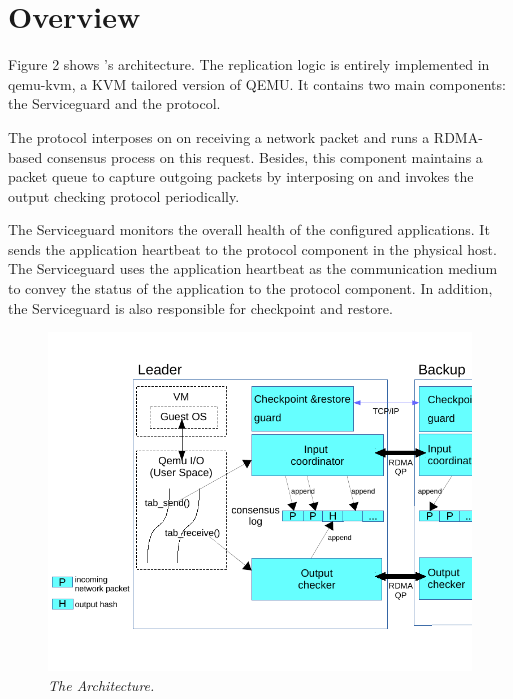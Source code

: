 \section{\xxx Overview} \label{sec:overview}

Figure 2 shows \xxx's architecture. The replication logic is entirely 
implemented in qemu-kvm, a KVM tailored version of QEMU. It contains 
two main components: the Serviceguard and the protocol. 

The protocol interposes on \tapsend on receiving a network packet and runs 
a RDMA-based consensus process on this request. Besides, this component 
maintains a packet queue to capture outgoing packets by interposing on 
\taprecv and invokes the output checking protocol periodically. 

The Serviceguard monitors the overall health of the configured applications. 
It sends the application heartbeat to the protocol component in the physical 
host. The Serviceguard uses the application heartbeat as the communication 
medium to convey the status of the application to the protocol component. 
In addition, the Serviceguard is also responsible for checkpoint and restore. 


\begin{figure}[t]
\centering
\includegraphics[width=.47\textwidth]{figures/arch}
\vspace{-.2in}
\caption{{\em The \xxx Architecture.}} \label{fig:arc}
\vspace{.05in}
\end{figure}
